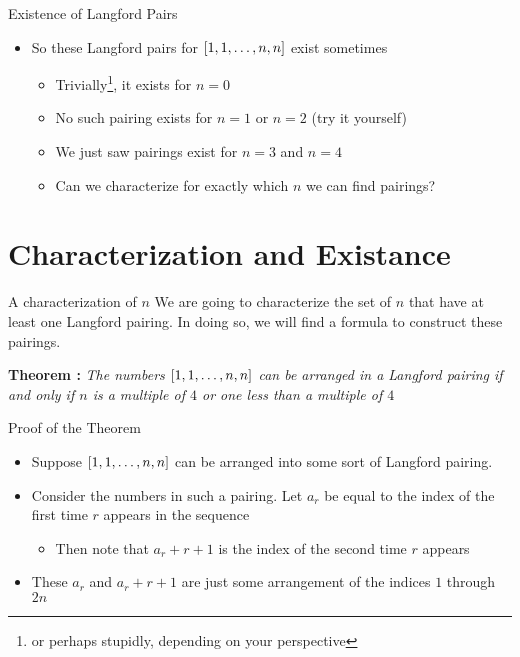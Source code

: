 \documentclass[aspectratio=169]{beamer}
\begin{document}
\begin{frame}{Existence of Langford Pairs}
    \begin{itemize}
        \item So these Langford pairs for $\bqty{1, 1, \ldots, n, n}$ exist sometimes
        \begin{itemize}
            \item Trivially\footnote{or perhaps stupidly, depending on your perspective}, it exists for $n = 0$ \pause
            \item No such pairing exists for $n = 1$ or $n = 2$ \textcolor{sigma@alertred}{(try it yourself)} \pause
            \item We just saw pairings exist for $n = 3$ and $n = 4$ \pause
            \item Can we characterize for exactly which $n$ we can find pairings?
        \end{itemize}
    \end{itemize}
\end{frame}

\section{Characterization and Existance}
\frame{\sectionpage}

\begin{frame}{A characterization of $n$}
    We are going to characterize the set of $n$ that have at least one Langford pairing. In doing so, we will find a formula to \textcolor{sigma@mainblue}{construct} these pairings. \pause
    
    \vspace{30pt}
    
    \textbf{Theorem \cite{Langford4m}: }{\itshape The numbers $\bqty{1, 1, \ldots, n, n}$ can be arranged in a Langford pairing if and only if $n$ is a multiple of $4$ or one less than a multiple of $4$}
\end{frame}

\begin{frame}{Proof of the Theorem}
    \begin{itemize}
        \item Suppose $\bqty{1, 1, \ldots, n, n}$ can be arranged into some sort of Langford pairing. \pause
        \item Consider the numbers in such a pairing. Let $a_r$ be equal to the index of the first time $r$ appears in the sequence
        \begin{itemize}
            \item Then note that $a_r + r + 1$ is the index of the second time $r$ appears
        \end{itemize} \pause
        \item These $a_r$ and $a_r + r + 1$ are just some arrangement of the indices $1$ through $2n$
    \end{itemize}
\end{frame}
\end{document}

